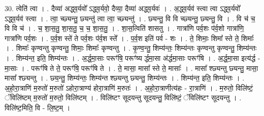 \documentclass[17pt]{extarticle}
\begin{document}
30. त्वेति॑ त्वा । . दैव्या॑ अद्ध्व॒र्यवो᳚ ऽद्ध्व॒र्यवो॒ दैव्या॒ दैव्या॑ अद्ध्व॒र्यवः॑ । . अ॒द्ध्व॒र्यव॑ स्त्वा त्वा ऽद्ध्व॒र्यवो᳚ ऽद्ध्व॒र्यव॑ स्त्वा । . त्वा॒ च्छ्यन्तु॒ छ्यन्तु॑ त्वा त्वा॒ च्छ्यन्तु॑ । . छ्यन्तु॒ वि वि च्छ्यन्तु॒ छ्यन्तु॒ वि । . वि च॑ च॒ वि वि च॑ । . च॒ शा॒स॒तु॒ शा॒स॒तु॒ च॒ च॒ शा॒स॒तु॒ । . शा॒स॒त्विति॑ शासतु । . गात्रा॑णि पर्व॒शः प॑र्व॒शो गात्रा॑णि॒ गात्रा॑णि पर्व॒शः । . प॒र्व॒श स्ते॑ ते पर्व॒शः प॑र्व॒श स्ते᳚ । . प॒र्व॒श इति॑ पर्व - शः । . ते॒ शिमाः॒ शिमा᳚ स्ते ते॒ शिमाः᳚ । . शिमाः᳚ कृण्वन्तु कृण्वन्तु॒ शिमाः॒ शिमाः᳚ कृण्वन्तु । . कृ॒ण्व॒न्तु॒ शिम्य॑न्तः॒ शिम्य॑न्तः कृण्वन्तु कृण्वन्तु॒ शिम्य॑न्तः । . शिम्य॑न्त॒ इति॒ शिम्य॑न्तः । . अ॒र्द्ध॒मा॒साः परूꣳ॑षि॒ परूꣳ॑ष्य र्द्धमा॒सा अ॑र्द्धमा॒साः परूꣳ॑षि । . अ॒र्द्ध॒मा॒सा इत्य॑र्द्ध - मा॒साः । . परूꣳ॑षि ते ते॒ परूꣳ॑षि॒ परूꣳ॑षि ते । . ते॒ मासा॒ मासा᳚ स्ते ते॒ मासाः᳚ । . मासा᳚ श्छ्यन्तु छ्यन्तु॒ मासा॒ मासा᳚ श्छ्यन्तु । . छ्य॒न्तु॒ शिम्य॑न्तः॒ शिम्य॑न्त श्छ्यन्तु छ्यन्तु॒ शिम्य॑न्तः । . शिम्य॑न्त॒ इति॒ शिम्य॑न्तः । . अ॒हो॒रा॒त्राणि॑ म॒रुतो॑ म॒रुतो॑ ऽहोरा॒त्राण्य॑ होरा॒त्राणि॑ म॒रुतः॑ । . अ॒हो॒रा॒त्राणीत्य॑हः - रा॒त्राणि॑ । . म॒रुतो॒ विलि॑ष्टं॒ ॅविलि॑ष्टम् म॒रुतो॑ म॒रुतो॒ विलि॑ष्टम् । . विलि॑ष्टꣳ सूदयन्तु सूदयन्तु॒ विलि॑ष्टं॒ ॅविलि॑ष्टꣳ सूदयन्तु । . विलि॑ष्ट॒मिति॒ वि - लि॒ष्ट॒म् । \newline
\end{document}
